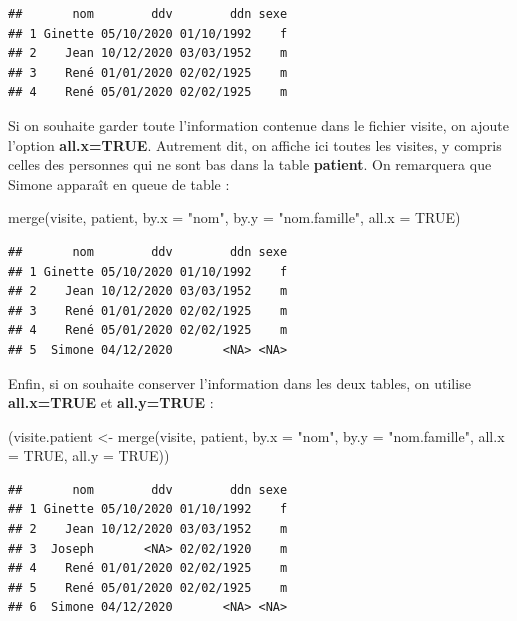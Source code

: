 \documentclass[
]{book}
\newenvironment{Shaded}{\begin{snugshade}}{\end{snugshade}}
\newcommand{\AttributeTok}[1]{\textcolor[rgb]{0.77,0.63,0.00}{#1}}
\newcommand{\ConstantTok}[1]{\textcolor[rgb]{0.00,0.00,0.00}{#1}}
\newcommand{\FunctionTok}[1]{\textcolor[rgb]{0.00,0.00,0.00}{#1}}
\newcommand{\NormalTok}[1]{#1}
\newcommand{\OtherTok}[1]{\textcolor[rgb]{0.56,0.35,0.01}{#1}}
\newcommand{\StringTok}[1]{\textcolor[rgb]{0.31,0.60,0.02}{#1}}
\theoremstyle{definition}
\theoremstyle{definition}
\theoremstyle{definition}
\theoremstyle{definition}
\theoremstyle{remark}
\begin{document}
\begin{verbatim}
##       nom        ddv        ddn sexe
## 1 Ginette 05/10/2020 01/10/1992    f
## 2    Jean 10/12/2020 03/03/1952    m
## 3    René 01/01/2020 02/02/1925    m
## 4    René 05/01/2020 02/02/1925    m
\end{verbatim}

Si on souhaite garder toute l'information contenue dans le fichier visite, on ajoute l'option \textbf{all.x=TRUE}. Autrement dit, on affiche ici toutes les visites, y compris celles des personnes qui ne sont bas dans la table \textbf{patient}. On remarquera que Simone apparaît en queue de table :

\begin{Shaded}
\begin{Highlighting}[]
\FunctionTok{merge}\NormalTok{(visite, patient, }\AttributeTok{by.x =} \StringTok{"nom"}\NormalTok{, }\AttributeTok{by.y =} \StringTok{"nom.famille"}\NormalTok{, }\AttributeTok{all.x =} \ConstantTok{TRUE}\NormalTok{)}
\end{Highlighting}
\end{Shaded}

\begin{verbatim}
##       nom        ddv        ddn sexe
## 1 Ginette 05/10/2020 01/10/1992    f
## 2    Jean 10/12/2020 03/03/1952    m
## 3    René 01/01/2020 02/02/1925    m
## 4    René 05/01/2020 02/02/1925    m
## 5  Simone 04/12/2020       <NA> <NA>
\end{verbatim}

Enfin, si on souhaite conserver l'information dans les deux tables, on utilise \textbf{all.x=TRUE} et \textbf{all.y=TRUE} :

\begin{Shaded}
\begin{Highlighting}[]
\NormalTok{(visite.patient }\OtherTok{\textless{}{-}} \FunctionTok{merge}\NormalTok{(visite, patient, }\AttributeTok{by.x =} \StringTok{"nom"}\NormalTok{,}
    \AttributeTok{by.y =} \StringTok{"nom.famille"}\NormalTok{, }\AttributeTok{all.x =} \ConstantTok{TRUE}\NormalTok{, }\AttributeTok{all.y =} \ConstantTok{TRUE}\NormalTok{))}
\end{Highlighting}
\end{Shaded}

\begin{verbatim}
##       nom        ddv        ddn sexe
## 1 Ginette 05/10/2020 01/10/1992    f
## 2    Jean 10/12/2020 03/03/1952    m
## 3  Joseph       <NA> 02/02/1920    m
## 4    René 01/01/2020 02/02/1925    m
## 5    René 05/01/2020 02/02/1925    m
## 6  Simone 04/12/2020       <NA> <NA>
\end{verbatim}
\end{document}
